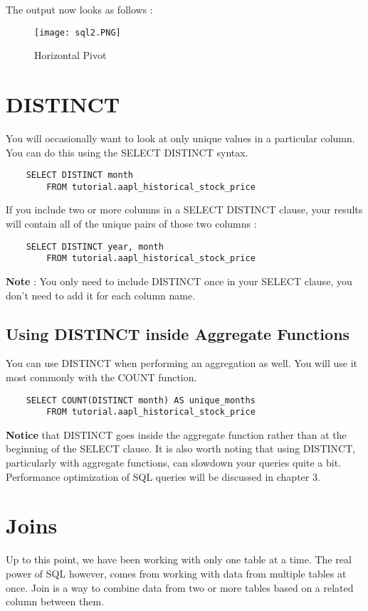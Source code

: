 \documentclass[12pt, letterpaper]{article}
\begin{document}
The output now looks as follows : 

\begin{figure}[H]
    \centering
    \texttt{[image: sql2.PNG]}
    \caption{Horizontal Pivot}
    \label{fig2}
\end{figure}


\section{DISTINCT}
You will occasionally want to look at only unique values in a particular column. You can do this using the SELECT DISTINCT syntax. 

\begin{verbatim}
    SELECT DISTINCT month
        FROM tutorial.aapl_historical_stock_price
\end{verbatim}

If you include two or more columns in a SELECT DISTINCT clause, your results will contain all of the unique pairs of those two columns : 

\begin{verbatim}
    SELECT DISTINCT year, month
        FROM tutorial.aapl_historical_stock_price
\end{verbatim}

\textbf{Note} : You only need to include DISTINCT once in your SELECT clause, you don't need to add it for each column name.

\subsection{Using DISTINCT inside Aggregate Functions}
You can use DISTINCT when performing an aggregation as well. You will use it most commonly with the COUNT function.

\begin{verbatim}
    SELECT COUNT(DISTINCT month) AS unique_months
        FROM tutorial.aapl_historical_stock_price
\end{verbatim}

\textbf{Notice} that DISTINCT goes inside the aggregate function rather than at the beginning of the SELECT clause. It is also worth noting that using DISTINCT, particularly with aggregate functions, can slowdown your queries quite a bit. Performance optimization of SQL queries will be discussed in chapter 3.


\section{Joins}
Up to this point, we have been working with only one table at a time. The real power of SQL however, comes from working with data from multiple tables at once. Join is a way to combine data from two or more tables based on a related column between them.
\end{document}
